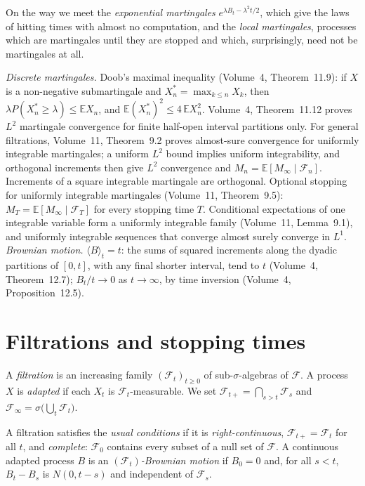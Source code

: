 On the way we meet the \emph{exponential martingales} $e^{\lambda B_t-\lambda^2t/2}$, which give the laws of hitting times with almost no computation, and the \emph{local martingales},
processes which are martingales until they are stopped and which, surprisingly, need not be martingales at all.

\begin{reminder}
\emph{Discrete martingales.} Doob's maximal inequality (Volume~4, Theorem~11.9): if $X$ is a non-negative submartingale and $X^*_n=\max_{k\le n}X_k$, then $\lambda P(X^*_n\ge\lambda)\le\mathbb E X_n$, and
$\mathbb E(X^*_n)^2\le4\,\mathbb EX_n^2$. Volume~4, Theorem~11.12 proves $L^2$ martingale convergence for finite half-open interval partitions only. For general filtrations, Volume~11, Theorem~9.2 proves almost-sure convergence for uniformly integrable martingales; a uniform $L^2$ bound implies uniform integrability, and orthogonal increments then give $L^2$ convergence and $M_n=\mathbb E[M_\infty\mid\mathcal F_n]$.
Increments of a square integrable martingale are orthogonal. Optional stopping for uniformly integrable martingales (Volume~11, Theorem~9.5): $M_T=\mathbb E[M_\infty\mid\mathcal F_T]$ for every
stopping time $T$. Conditional expectations of one integrable variable form a uniformly integrable family (Volume~11, Lemma~9.1), and uniformly integrable sequences that converge almost
surely converge in $L^1$. \emph{Brownian motion.} $\langle B\rangle_t=t$: the sums of squared increments along the dyadic partitions of $[0,t]$, with any final shorter interval, tend to $t$ (Volume~4, Theorem~12.7); $B_t/t\to0$ as $t\to\infty$, by
time inversion (Volume~4, Proposition~12.5).
\end{reminder}

\section{Filtrations and stopping times}

A \emph{filtration} is an increasing family $(\mathcal F_t)_{t\ge0}$ of sub-$\sigma$-algebras of $\mathcal F$. A process $X$ is \emph{adapted} if each $X_t$ is $\mathcal F_t$-measurable. We set
$\mathcal F_{t+}=\bigcap_{s>t}\mathcal F_s$ and $\mathcal F_\infty=\sigma\bigl(\bigcup_t\mathcal F_t\bigr)$.

\begin{definition}\label{def:usual}
A filtration satisfies the \emph{usual conditions} if it is \emph{right-continuous}, $\mathcal F_{t+}=\mathcal F_t$ for all $t$, and \emph{complete}: $\mathcal F_0$ contains every subset of a
null set of $\mathcal F$. A continuous adapted process $B$ is an \emph{$(\mathcal F_t)$-Brownian motion} if $B_0=0$ and, for all $s<t$, $B_t-B_s$ is $N(0,t-s)$ and independent of $\mathcal F_s$.
\end{definition}

